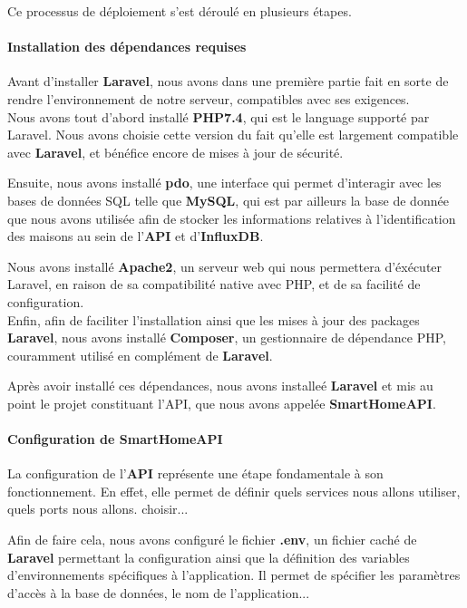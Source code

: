\documentclass[10pt, a4paper]{report}
\begin{document}
	Ce processus de déploiement s'est déroulé en plusieurs étapes.
	\paragraph{Installation des dépendances requises\\}
	
	Avant d'installer \textbf{Laravel}, nous avons dans une première partie fait en sorte de rendre l'environnement de notre serveur, compatibles avec ses exigences.\\
	
	Nous avons tout d'abord installé \textbf{PHP7.4}, qui est le language supporté par Laravel. Nous avons choisie cette version du fait qu'elle est largement compatible avec \textbf{Laravel}, et bénéfice encore de mises à jour de sécurité. 
	
	Ensuite, nous avons installé \textbf{pdo}, une interface qui permet d'interagir avec les bases de données SQL telle que \textbf{MySQL}, qui est par ailleurs la base de donnée que nous avons utilisée afin de stocker les informations relatives à l'identification des maisons au sein de l'\textbf{API} et d'\textbf{InfluxDB}.
	
	Nous avons installé \textbf{Apache2}, un serveur web qui nous permettera d'éxécuter Laravel, en raison de sa compatibilité native avec PHP, et de sa facilité de configuration. \\
	Enfin, afin de faciliter l'installation ainsi que les mises à jour des packages \textbf{Laravel}, nous avons installé \textbf{Composer}, un gestionnaire de dépendance PHP, couramment utilisé en complément de \textbf{Laravel}.
	
	Après avoir installé ces dépendances, nous avons installeé \textbf{Laravel} et mis au point le projet constituant l'API, que nous avons appelée \textbf{SmartHomeAPI}.
	

	
	\paragraph{Configuration de SmartHomeAPI\\}
	La configuration de l'\textbf{API} représente une étape fondamentale à son fonctionnement. En effet, elle permet de définir quels services nous allons utiliser, quels ports nous allons. choisir...
	
	Afin de faire cela, nous avons configuré le fichier \textbf{.env}, un fichier caché de \textbf{Laravel} permettant la configuration ainsi que la définition des variables d'environnements spécifiques à l'application. Il permet de spécifier les paramètres d'accès à la base de données, le nom de l'application...
	
\end{document}
